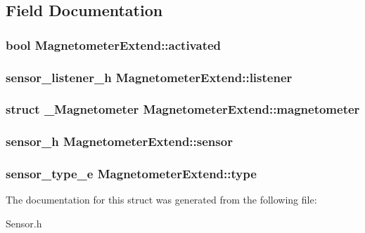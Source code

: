 \subsection{Field Documentation}
\subsubsection[{activated}]{\setlength{\rightskip}{0pt plus 5cm}bool Magnetometer\-Extend\-::activated}\label{structMagnetometerExtend_aed95926c2ba46526f10fadb3ec7c4e0c}
\subsubsection[{listener}]{\setlength{\rightskip}{0pt plus 5cm}sensor\-\_\-listener\-\_\-h Magnetometer\-Extend\-::listener}\label{structMagnetometerExtend_abcb76504bf1dc981b51456182312564f}
\subsubsection[{magnetometer}]{\setlength{\rightskip}{0pt plus 5cm}struct {\bf \-\_\-\-Magnetometer} Magnetometer\-Extend\-::magnetometer}\label{structMagnetometerExtend_a17af838bb14cdb37496b7f9af4edfeae}
\subsubsection[{sensor}]{\setlength{\rightskip}{0pt plus 5cm}sensor\-\_\-h Magnetometer\-Extend\-::sensor}\label{structMagnetometerExtend_a7e724ca6dfd68242fa0f6e4acf825f98}
\subsubsection[{type}]{\setlength{\rightskip}{0pt plus 5cm}sensor\-\_\-type\-\_\-e Magnetometer\-Extend\-::type}\label{structMagnetometerExtend_abf66a10052381ab8d323cb3e3b971602}


The documentation for this struct was generated from the following file\-:\begin{DoxyCompactItemize}
\item 
Sensor.\-h\end{DoxyCompactItemize}
